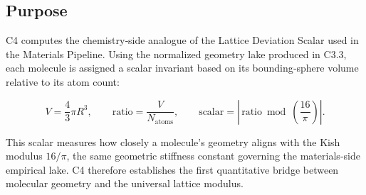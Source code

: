 \documentclass[11pt, letterpaper, openany]{book}
\begin{document}
\subsection*{Purpose}
C4 computes the chemistry‑side analogue of the Lattice Deviation Scalar used in
the Materials Pipeline. Using the normalized geometry lake produced in C3.3, each
molecule is assigned a scalar invariant based on its bounding‑sphere volume
relative to its atom count:



\[
    V = \frac{4}{3}\pi R^3, \qquad
    \text{ratio} = \frac{V}{N_{\text{atoms}}}, \qquad
    \text{scalar} = \left| \, \text{ratio} \bmod \left(\frac{16}{\pi}\right) \right|.
\]



This scalar measures how closely a molecule’s geometry aligns with the Kish
modulus \(16/\pi\), the same geometric stiffness constant governing the
materials‑side empirical lake. C4 therefore establishes the first quantitative
bridge between molecular geometry and the universal lattice modulus.
\end{document}
